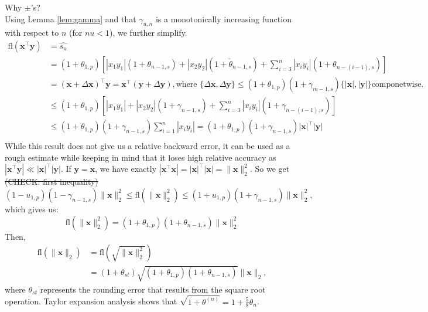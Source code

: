 \documentclass{article}
\newcommand{\tth}{\theta}
\newcommand{\bb}[1]{\mathbf{#1}}
\newcommand{\fl}{\mathrm{fl}}
\theoremstyle{definition}
\begin{document}
{\color{blue} Why $\pm$'s?\\}
Using Lemma \ref{lem:gamma} and that $\gamma_{u,n}$ is a monotonically increasing function with respect to $n$  (for $nu < 1$), we further simplify. 
\begin{align*}
    \fl(\bb{x}^{\top}\bb{y}) &= \hat{s_n}\\
    &= (1+\tth_{1,p})\left[|x_1y_1|(1+\tth_{n-1,s})+|x_2y_2|(1+\tilde{\tth}_{n-1,s}) + \sum_{i=3}^n|x_iy_i|(1+\tth_{n-(i-1),s}) \right] \\
    &= (\bb{x}+\Delta \bb{x})^{\top} \bb{y} = \bb{x}^{\top}(\bb{y}+\Delta \bb{y}), \text{where } \{\Delta \bb{x}, \Delta \bb{y}\} \leq (1+\tth_{1,p})(1+\gamma_{m-1,s})\{|\bb{x}|,|\bb{y}|\}\text{componetwise.}\\
    &\leq(1+\tth_{1,p})\left[|x_1y_1|+|x_2y_2|(1+\gamma_{n-1,s})+ \sum_{i=3}^n|x_iy_i|(1+\gamma_{n-(i-1),s}) \right]\\
    &\leq (1+\tth_{1,p})(1+\gamma_{n-1,s})\sum_{i=1}^n|x_iy_i|=(1+\tth_{1,p})(1+\gamma_{n-1,s})|\bb{x}|^{\top}|\bb{y}|\\
\end{align*}
While this result does not give us a relative backward error, it can be used as a rough estimate while keeping in mind that it loses high relative accuracy as  $|\bb{x}^{\top}\bb{y}| \ll |\bb{x}|^{\top}|\bb{y}|$.
If $\bb{y}=\bb{x}$, we have exactly $|\bb{x}^{\top}\bb{x}| = |\bb{x}|^{\top}|\bb{x}|=\|\bb{x}\|_2^2$.
So we get {\color{blue}\sout{(CHECK: first inequality)}}
$$
(1-u_{1,p})(1-\gamma_{n-1,s})\|\bb{x}\|_2^2 \leq \fl(\|\bb{x}\|_2^2) \leq (1+u_{1,p})(1+\gamma_{n-1,s})\|\bb{x}\|_2^2,
$$
which gives us:
$$
\fl(\|\bb{x}\|_2^2) = (1+\tth_{1,p})(1+\tth_{n-1,s})\|\bb{x}\|_2^2
$$
Then, 
\begin{align*}
\fl(\|\bb{x}\|_2) &= \fl(\sqrt{\|\bb{x}\|_2^2})\\
&= (1+\tth_{st})\sqrt{(1+\tth_{1,p})(1+\tth_{n-1,s})}\|\bb{x}\|_2,
\end{align*}
where $\tth_{st}$ represents the rounding error that results from the square root operation. 
Taylor expansion analysis shows that $\sqrt{1+\tth^{(n)}}=1+\frac{5}{8}\tth_{n}$.
\end{document}
